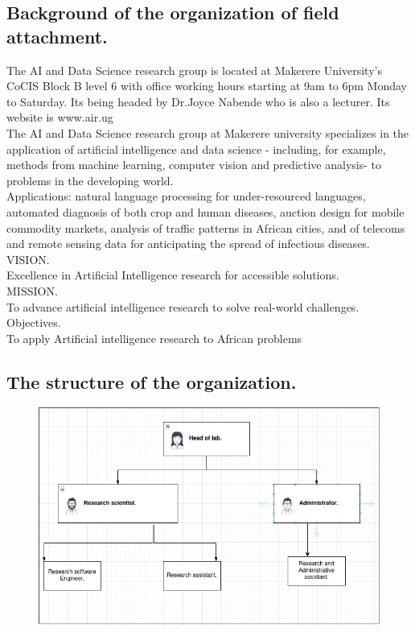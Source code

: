 \documentclass[11pt]{article}
\begin{document}
\subsection{Background of the organization of field attachment.}
The AI and Data Science research group is located at Makerere University's CoCIS Block B level 6 with office working hours starting at 9am to 6pm Monday to Saturday. Its being headed by Dr.Joyce Nabende who is also a lecturer. Its website is www.air.ug\\

The AI and Data Science research group at Makerere university specializes in the application of artificial intelligence and data science - including, for example, methods from machine learning, computer vision and predictive analysis- to problems in the developing world.\\

Applications: natural language processing for under-resourced languages, automated diagnosis of both crop and human diseases, auction design for mobile commodity markets, analysis of traffic patterns in African cities, and of telecoms and remote sensing data for anticipating the spread of infectious diseases.\\

VISION.\\
Excellence in Artificial Intelligence research for accessible solutions.\\

MISSION.\\
To advance artificial intelligence research to solve real-world challenges.\\

Objectives.\\
To apply Artificial intelligence research to African problems



\subsection{The structure of the organization.}
\begin{figure}[h]
	\centerline{\small 
		\includegraphics[height=0.4\textheight]  {chart}}
\end{figure}
\end{document}

